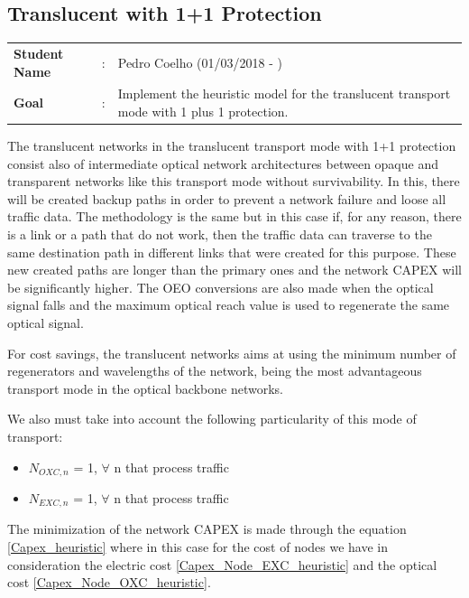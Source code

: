 \clearpage

\subsection{Translucent with 1+1 Protection}\label{heuristic_Transl_Protection}
\begin{tcolorbox}	
\begin{tabular}{p{2.75cm} p{0.2cm} p{10.5cm}} 	
\textbf{Student Name}  &:& Pedro Coelho    (01/03/2018 - )\\
\textbf{Goal}          &:& Implement the heuristic model for the translucent transport mode with 1 plus 1 protection.
\end{tabular}
\end{tcolorbox}

\vspace{11pt}
The translucent networks in the translucent transport mode with 1+1 protection consist also of intermediate optical network architectures between opaque and transparent networks like this transport mode without survivability. In this, there will be created backup paths in order to prevent a network failure and loose all traffic data. The methodology is the same but in this case if, for any reason, there is a link or a path that do not work, then the traffic data can traverse to the same destination path in different links that were created for this purpose. These new created paths are longer than the primary ones and the network CAPEX will be significantly higher. The OEO conversions are also made when the optical signal falls and the maximum optical reach value is used to regenerate the same optical signal.

For cost savings, the translucent networks aims at using the minimum number of regenerators and wavelengths of the network, being the most advantageous transport mode in the optical backbone networks.

We also must take into account the following particularity of this mode of transport:
\begin{itemize}
  \item $N_{OXC,n}$ = 1, \quad $\forall$ n that process traffic
  \item $N_{EXC,n}$ = 1, \quad $\forall$ n that process traffic
\end{itemize}

The minimization of the network CAPEX is made through the equation \ref{Capex_heuristic} where in this case for the cost of nodes we have in consideration the electric cost \ref{Capex_Node_EXC_heuristic} and the optical cost \ref{Capex_Node_OXC_heuristic}.\\


